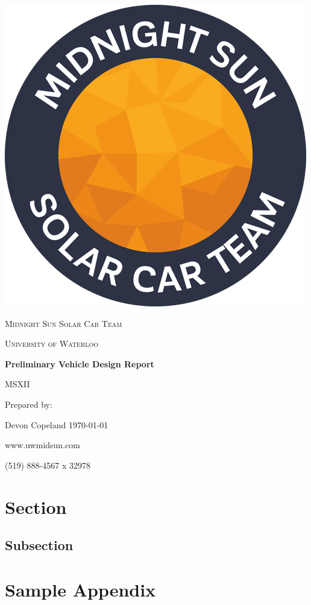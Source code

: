\documentclass[12pt]{article}
\begin{document}
\begin{titlepage}
	\vspace*{2cm}
	\centering
	\includegraphics[width=.25\textwidth]{./images/midnightSunLogoCircle.png}\par
	\vspace{1.5cm}
	{\scshape\LARGE Midnight Sun Solar Car Team \par}
	{\scshape\large University of Waterloo\par}
	\vspace{2.2cm}
	{\huge\bfseries Preliminary Vehicle Design Report\par} 
	\vspace{0.2cm}
	\large MSXII %
	\vspace{2.2cm}	
	\par Prepared by:\par
	Devon Copeland
	\today\par
	\vfill
	www.uwmidsun.com \par
	(519) 888-4567 x 32978
\end{titlepage}

\section{Section}
\subsection{Subsection}

\pagebreak
{}


\pagebreak
\appendix
\section{Sample Appendix}
\label{app:simple}

\end{document}

